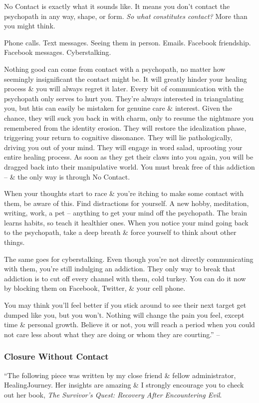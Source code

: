 \documentclass{article}
\numberwithin{equation}{section}
\begin{document}
No Contact is exactly what it sounds like. It means you don't contact the psychopath in any way, shape, or form. \textit{So what constitutes contact?} More than you might think.

Phone calls. Text messages. Seeing them in person. Emails. Facebook friendship. Facebook messages. Cyberstalking.

Nothing good can come from contact with a psychopath, no matter how seemingly insignificant the contact might be. It will greatly hinder your healing process \& you will always regret it later. Every bit of communication with the psychopath only serves to hurt you. They're always interested in triangulating you, but htis can easily be mistaken for genuine care \& interest. Given the chance, they will suck you back in with charm, only to resume the nightmare you remembered from the identity erosion. They will restore the idealization phase, triggering your return to cognitive dissonance. They will lie pathologically, driving you out of your mind. They will engage in word salad, uprooting your entire healing process. As soon as they get their claws into you again, you will be dragged back into their manipulative world. You must break free of this addiction -- \& the only way is through No Contact.

When your thoughts start to race \& you're itching to make some contact with them, be aware of this. Find distractions for yourself. A new hobby, meditation, writing, work, a pet -- anything to get your mind off the psychopath. The brain learns habits, so teach it healthier ones. When you notice your mind going back to the psychopath, take a deep breath \& force yourself to think about other things.

The same goes for cyberstalking. Even though you're not directly communicating with them, you're still indulging an addiction. They only way to break that addiction is to cut off every channel with them, cold turkey. You can do it now by blocking them on Facebook, Twitter, \& your cell phone.

You may think you'll feel better if you stick around to see their next target get dumped like you, but you won't. Nothing will change the pain you feel, except time \& personal growth. Believe it or not, you will reach a period when you could not care less about what they are doing or whom they are courting.'' -- \cite[pp. 102--103]{MacKenzie2015}

\subsubsection{Closure Without Contact}
``The following piece was written by my close friend \& fellow administrator, HealingJourney. Her insights are amazing \& I strongly encourage you to check out her book, \textit{The Survivor's Quest: Recovery After Encountering Evil}.
\end{document}
